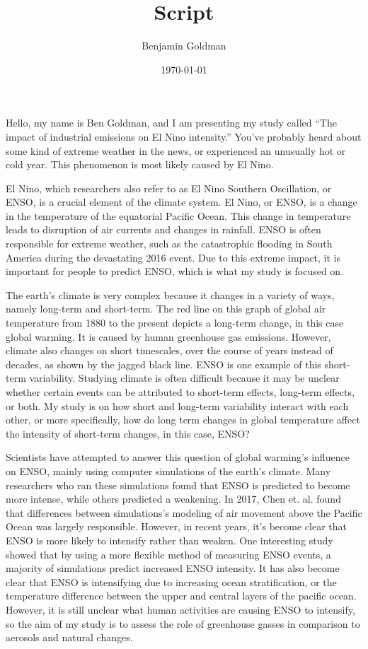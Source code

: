 \documentclass{basic}
\author{Benjamin Goldman}
\date{\today}
\title{Script}
\begin{document}
\maketitle
Hello, my name is Ben Goldman, and I am presenting my study called ``The impact of industrial emissions on El Nino intensity.'' You've probably heard about some kind of extreme weather in the news, or experienced an unusually hot or cold year. This phenomenon is most likely caused by El Nino.

El Nino, which researchers also refer to as El Nino Southern Oscillation, or ENSO, is a crucial element of the climate system. El Nino, or ENSO, is a change in the temperature of the equatorial Pacific Ocean. This change in temperature leads to disruption of air currents and changes in rainfall. ENSO is often responsible for extreme weather, such as the catastrophic flooding in South America during the devastating 2016 event. Due to this extreme impact, it is important for people to predict ENSO, which is what my study is focused on.

The earth's climate is very complex because it changes in a variety of ways, namely long-term and short-term. The red line on this graph of global air temperature from 1880 to the present depicts a long-term change, in this case global warming. It is caused by human greenhouse gas emissions. However, climate also changes on short timescales, over the course of years instead of decades, as shown by the jagged black line. ENSO is one example of this short-term variability. Studying climate is often difficult because it may be unclear whether certain events can be attributed to short-term effects, long-term effects, or both. My study is on how short and long-term variability interact with each other, or more specifically, how do long term changes in global temperature affect the intensity of short-term changes, in this case, ENSO?

Scientists have attempted to answer this question of global warming's influence on ENSO, mainly using computer simulations of the earth's climate. Many researchers who ran these simulations found that ENSO is predicted to become more intense, while others predicted a weakening. In 2017, Chen et. al. found that differences between simulations's modeling of air movement above the Pacific Ocean was largely responsible. However, in recent years, it's become clear that ENSO is more likely to intensify rather than weaken. One interesting study showed that by using a more flexible method of measuring ENSO events, a majority of simulations predict increased ENSO intensity. It has also become clear that ENSO is intensifying due to increasing ocean stratification, or the temperature difference between the upper and central layers of the pacific ocean. However, it is still unclear what human activities are causing ENSO to intensify, so the aim of my study is to assess the role of greenhouse gasses in comparison to aerosols and natural changes.
\end{document}

